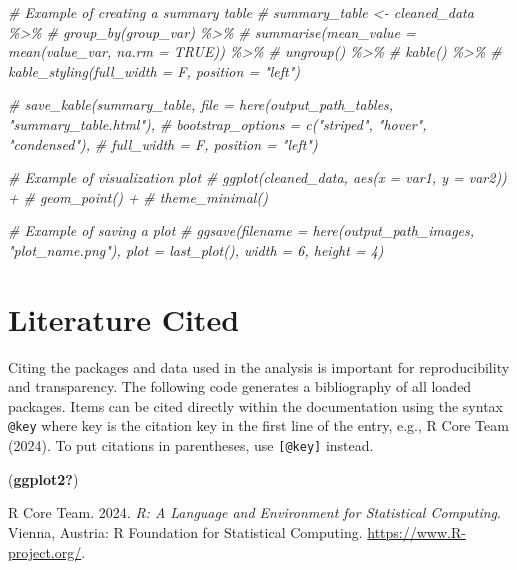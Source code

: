 \documentclass[
]{article}
\newenvironment{Shaded}{\begin{snugshade}}{\end{snugshade}}
\newcommand{\CommentTok}[1]{\textcolor[rgb]{0.56,0.35,0.01}{\textit{#1}}}
\newlength{\cslhangindent}
\newenvironment{CSLReferences}[2] %
 {\begin{list}{}{%
  \setlength{\itemindent}{0pt}
  \setlength{\leftmargin}{0pt}
  \setlength{\parsep}{0pt}
  \ifodd #1
   \setlength{\leftmargin}{\cslhangindent}
   \setlength{\itemindent}{-1\cslhangindent}
  \fi
  \setlength{\itemsep}{#2\baselineskip}}}
 {\end{list}}
\begin{document}
\begin{Shaded}
\begin{Highlighting}[]
\CommentTok{\# Example of creating a summary table }
\CommentTok{\# summary\_table \textless{}{-} cleaned\_data \%\textgreater{}\%}
\CommentTok{\#   group\_by(group\_var) \%\textgreater{}\%}
\CommentTok{\#   summarise(mean\_value = mean(value\_var, na.rm = TRUE)) \%\textgreater{}\%}
\CommentTok{\#   ungroup() \%\textgreater{}\%}
\CommentTok{\#   kable() \%\textgreater{}\%}
\CommentTok{\#   kable\_styling(full\_width = F, position = "left") }

\CommentTok{\# save\_kable(summary\_table, file = here(output\_path\_tables, "summary\_table.html"),}
\CommentTok{\#   bootstrap\_options = c("striped", "hover", "condensed"),}
\CommentTok{\#   full\_width = F, position = "left")}
\end{Highlighting}
\end{Shaded}

\begin{Shaded}
\begin{Highlighting}[]
\CommentTok{\# Example of visualization plot}
\CommentTok{\# ggplot(cleaned\_data, aes(x = var1, y = var2)) +}
\CommentTok{\#   geom\_point() +}
\CommentTok{\#   theme\_minimal()}

\CommentTok{\# Example of saving a plot}
\CommentTok{\# ggsave(filename = here(output\_path\_images, "plot\_name.png"), plot = last\_plot(), width = 6, height = 4)}
\end{Highlighting}
\end{Shaded}

\section{Literature Cited}\label{literature-cited}

Citing the packages and data used in the analysis is important for
reproducibility and transparency. The following code generates a
bibliography of all loaded packages. Items can be cited directly within
the documentation using the syntax \texttt{@key} where key is the
citation key in the first line of the entry, e.g., R Core Team (2024).
To put citations in parentheses, use \texttt{{[}@key{]}} instead.

(\textbf{ggplot2?})

\label{refs}
\begin{CSLReferences}{1}{0}
R Core Team. 2024. \emph{R: A Language and Environment for Statistical
Computing}. Vienna, Austria: R Foundation for Statistical Computing.
\url{https://www.R-project.org/}.

\end{CSLReferences}
\end{document}
